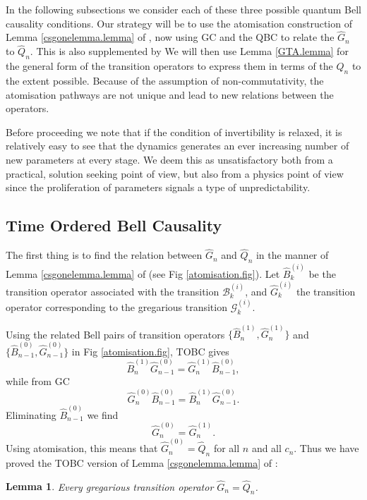 \documentclass[11pt]{article}
\newtheorem{lemma}[theorem]{Lemma}
\newcommand{\hG}{\hat G}
\newcommand{\hQ}{\hat Q}
\newcommand{\hB}{\hat B}
\newcommand{\cG}{\mathcal G}
\newcommand{\cB}{\mathcal B}
\begin{document}
 
In the following subsections we consider each of these  three possible
quantum  Bell causality conditions. Our strategy will be to use the 
atomisation   construction of  Lemma \ref{csgonelemma.lemma} of
\cite{csgone}, now using  GC and the QBC to relate the
  $\hG_n$  to $\hQ_n$. This is also supplemented by We will then use  Lemma 
\ref{GTA.lemma}  for the general form of the transition
operators to express them in terms of the $\hQ_n$ to the extent
possible.  Because of the assumption of non-commutativity, the
atomisation   pathways are not unique and lead to new relations
between the operators. 


Before proceeding we note that if the  condition of invertibility is relaxed,
it is relatively easy to see that the dynamics generates an ever increasing number of new parameters at every
stage. We deem this as unsatisfactory both from a practical, solution
seeking point of view, but also from a physics point of view since the
proliferation of parameters signals a type of unpredictability. 
 

\subsection{Time Ordered Bell Causality}\label{sec1}
\label{tobc.ssec} 

The first thing is to find the  relation between $\hG_n$ and $\hQ_n$
in the manner of  Lemma \ref{csgonelemma.lemma}   of \cite{csgone}
(see Fig \ref{atomisation.fig}).  Let
$\hB_k^{(i)}$ be the transition operator associated with the
  transition $\cB_k^{(i)}$, and $\hG_k^{(i)}$ the transition operator 
  corresponding to the gregarious transition $\cG_k^{(i)}$. 


Using the related Bell pairs of transition
operators 
$\{\hB_n^{(1)}, \hG_n^{(1)} \}$  and $\{\hB_{n-1}^{(0)},
\hG_{n-1}^{(0)} \}$ in Fig \ref{atomisation.fig}, TOBC gives 
\begin{equation}
\hB_{n}^{(1)}\hG_{n-1}^{(0)}=\hG_{n}^{(1)}\hB_{n-1}^{(0)}, 
\end{equation}
while from  GC 
\begin{equation}
\hG_{n}^{(0)}\hB_{n-1}^{(0)}=\hB_{n}^{(1)}\hG_{n-1}^{(0)}. 
\end{equation}
Eliminating $\hB_{n-1}^{(0)}$ we find 
\begin{equation}
  \hG_{n}^{(0)}= \hG_{n}^{(1)}. 
  \end{equation} 
Using atomisation, this means that $\hG_n^{(0)}=\hQ_n$ for all
$n$ and all $c_n$.   Thus we have proved the TOBC version of Lemma \ref{csgonelemma.lemma}
of \cite{csgone}: 
\begin{lemma} 
Every gregarious transition operator $\hG_n =
\hQ_n$. \label{lemmatwotobc.lemma} 
\end{lemma} 
\end{document}
